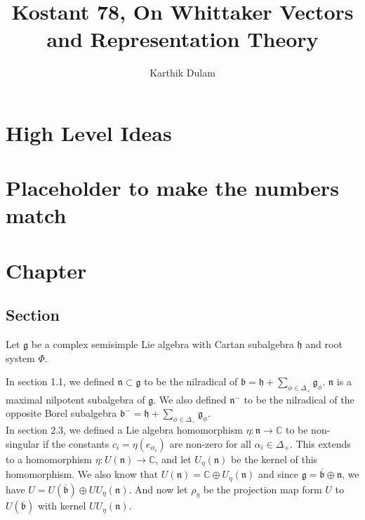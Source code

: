 \documentclass{article}
\title{Kostant 78, On Whittaker Vectors and Representation Theory}
\author{Karthik Dulam}
\theoremstyle{mytheoremstyle}
\theoremstyle{mytheoremstyle}
\theoremstyle{myproblemstyle}
\begin{document}
    \maketitle

\section{High Level Ideas}


\section{Placeholder to make the numbers match}

\section{Chapter}

\subsection{Section}
    
    Let $\mathfrak g$ be a complex semisimple Lie algebra with Cartan subalgebra $\mathfrak h$ and root system $\Phi$.

    In section 1.1, we defined $\mathfrak n \subset \mathfrak g$ to be the nilradical of 
    $\mathfrak b = \mathfrak h + \sum_{\phi \in \Delta_+} \mathfrak g_\phi$. $\mathfrak n$ is a maximal nilpotent subalgebra 
    of $\mathfrak g$. We also defined $\mathfrak n^-$ to be the nilradical of the opposite Borel subalgebra 
    $\mathfrak b^- = \mathfrak h + \sum_{\phi \in \Delta_-} \mathfrak g_\phi$. \\

    In section 2.3, we defined a Lie algebra homomorphism $\eta: \mathfrak n \to \mathbb C$ to be non-singular if 
    the constants $c_i = \eta(e_{\alpha_i})$ are non-zero for all $\alpha_i \in \Delta_+$. This extends to a homomorphism 
    $\eta: U(\mathfrak n) \to \mathbb C$, and let $U_\eta(\mathfrak n)$ be the kernel of this homomorphism. 
    We also know that $U(\mathfrak n) = \mathbb C \oplus U_\eta(\mathfrak n)$ and since $\mathfrak g = \overline{\mathfrak b} \oplus \mathfrak n$,
    we have $U = U(\overline{\mathfrak b}) \oplus U U_\eta(\mathfrak n)$. And now let $\rho_\eta$ be the projection map
    form $U$ to $U(\overline{\mathfrak b})$ with kernel $UU_\eta(\mathfrak n)$. \\
\end{document}

